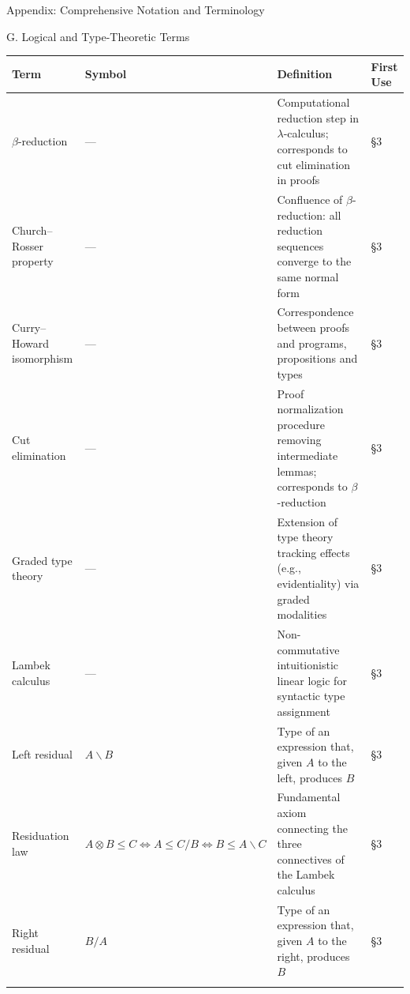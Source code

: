 \documentclass[
  ignorenonframetext,
]{beamer}
\newcounter{none} %
\begin{document}
\begin{frame}[fragile]{Appendix: Comprehensive Notation and Terminology}
\begin{block}{G. Logical and Type-Theoretic Terms}
\protect{}\label{g.-logical-and-type-theoretic-terms}
{\def\LTcaptype{none} %
\begin{longtable}[]{@{}
  >{\raggedright\arraybackslash}p{}
  >{\centering\arraybackslash}p{}
  >{\raggedright\arraybackslash}p{}
  >{\centering\arraybackslash}p{}@{}}
\toprule\noalign{}
\begin{minipage}[b]{\linewidth}\raggedright
Term
\end{minipage} & \begin{minipage}[b]{\linewidth}\centering
Symbol
\end{minipage} & \begin{minipage}[b]{\linewidth}\raggedright
Definition
\end{minipage} & \begin{minipage}[b]{\linewidth}\centering
First Use
\end{minipage} \\
\midrule\noalign{}
\endhead
\(\beta\)-reduction & --- & Computational reduction step in
\(\lambda\)-calculus; corresponds to cut elimination in proofs & §3 \\
Church--Rosser property & --- & Confluence of \(\beta\)-reduction: all
reduction sequences converge to the same normal form & §3 \\
Curry--Howard isomorphism & --- & Correspondence between proofs and
programs, propositions and types & §3 \\
Cut elimination & --- & Proof normalization procedure removing
intermediate lemmas; corresponds to \(\beta\)-reduction & §3 \\
Graded type theory & --- & Extension of type theory tracking effects
(e.g., evidentiality) via graded modalities & §3 \\
Lambek calculus & --- & Non-commutative intuitionistic linear logic for
syntactic type assignment & §3 \\
Left residual & \(A \backslash B\) & Type of an expression that, given
\(A\) to the left, produces \(B\) & §3 \\
Residuation law &
\(A \otimes B \leq C \iff A \leq C / B \iff B \leq A \backslash C\) &
Fundamental axiom connecting the three connectives of the Lambek
calculus & §3 \\
Right residual & \(B / A\) & Type of an expression that, given \(A\) to
the right, produces \(B\) & §3 \\
\bottomrule\noalign{}
\end{longtable}
}
\end{block}


\end{frame}
\end{document}
